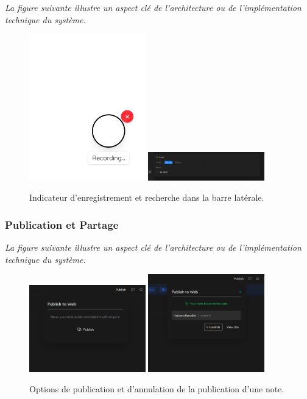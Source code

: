 \noindent
\textit{La figure suivante illustre un aspect clé de l'architecture ou de l'implémentation technique du système.}
\begin{figure}[H]
    \centering
    \includegraphics[width=0.45\textwidth]{assets/docs/web/on-record.png}
    \hfill
    \includegraphics[width=0.45\textwidth]{assets/docs/web/sidebar-search.png}
    \caption{Indicateur d'enregistrement et recherche dans la barre latérale.}
    \label{fig:web-record-search}
\end{figure}

\subsubsection{Publication et Partage}
\noindent
\textit{La figure suivante illustre un aspect clé de l'architecture ou de l'implémentation technique du système.}
\begin{figure}[H]
    \centering
    \includegraphics[width=0.45\textwidth]{assets/docs/web/publish-seciton.png}
    \hfill
    \includegraphics[width=0.45\textwidth]{assets/docs/web/unpublish.png}
    \caption{Options de publication et d'annulation de la publication d'une note.}
    \label{fig:web-publish}
\end{figure}

